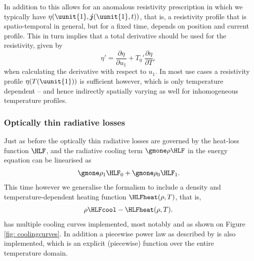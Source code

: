 In addition to this {\legolas} allows for an anomalous resistivity prescription in which we typically have $\eta(\uunit{1}, \boldsymbol{j}(\uunit{1}, t))$, that is, a resistivity profile that is spatio-temporal in general, but for a fixed time, depends on position and current profile. This in turn implies that a total derivative should be used for the resistivity, given by
\begin{equation}
  \eta' = \frac{\partial \eta}{\partial u_1} + T_0'\frac{\partial \eta}{\partial T},
\end{equation}
when calculating the derivative with respect to $u_1$. In most use cases a resistivity profile $\eta(T(\uunit{1}))$ is sufficient however, which is only temperature dependent -- and hence indirectly spatially varying as well for inhomogeneous temperature profiles.

\subsubsection{Optically thin radiative losses}
Just as before the optically thin radiative losses are governed by the heat-loss function $\HLF$, and the radiative cooling term $\gmone \rho \HLF$ in the energy equation can be linearised as
\begin{equation}
  \gmone \rho_1 \HLF_0 + \gmone \rho_0 \HLF_1.
\end{equation}
This time however we generalise the formalism to include a density and temperature-dependent heating function
$\HLFheat(\rho, T)$, that is,
\begin{equation}
  \rho\HLFcool - \HLFheat(\rho, T).
\end{equation}
{\legolas} has multiple cooling curves implemented, most notably {\jccorona} and {\spexdm} as shown on Figure \ref{fig: coolingcurves}. In addition a piecewise power law as described by \citet{rosner1978} is also implemented, which is an explicit (piecewise) function over the entire temperature domain.

